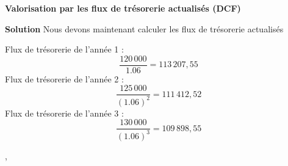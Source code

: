 \documentclass{beamer}
\begin{document}
\begin{frame}{\textbf{Valorisation par les flux de trésorerie actualisés (DCF)}}
	
	\begin{exampleblock}{\textbf{Solution}}
Nous devons maintenant calculer les flux de trésorerie actualisés
		
Flux de trésorerie de l'année 1 : 
\[ \frac{120\,000}{1.06}=113\,207,55\]
Flux de trésorerie de l'année 2 : 
\[ \frac{125\,000}{(1.06)^2}=111\,412,52 \]
Flux de trésorerie de l'année 3 : 
\[ \frac{130\,000}{(1.06)^3}=109\,898,55 \]

		
		
	\end{exampleblock}
	
	
,\end{frame}
\end{document}
